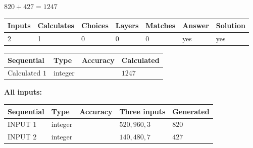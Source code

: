 \documentclass{ctexart}
\begin{document}
 

$ %
820 +  %
427=   %
1247$
 
 
\noindent{}
 
 

 
   
   
   
   
\noindent\begin{tabular}{|l|l|l|l|l|l|l|}
 \hline
Inputs & Calculates & Choices & Layers & Matches & Answer & Solution \\ \hline
 2  & 
 1  & 
 0
  & 
 0  & 
 0  & 
  yes & 
  yes 
  \\ \hline
 \end{tabular}
   
   
   
   
\noindent{}
   
   
  
  
\noindent\begin{tabular}{|l|l|l|l|}
\hline
 Sequential & Type & Accuracy & Calculated \\ 
\hline
 
 
  Calculated $  1 $ & integer &  & 
  $ 1247 $ 
 \\  \hline  
 \end{tabular}
   
   
   
   
\noindent\vspace{0.1in}\hspace{-0.08in} {\textbf{\Large{All inputs: }}}
   
   
  
  
\noindent\begin{tabular}{|l|l|l|l|l|}
\hline
 Sequential & Type & Accuracy & Three inputs & Generated \\ 
\hline
 
 
  INPUT $  1 $ & integer &  & $
 520
 , 
 960
 , 
 3
 $ & $ 820 $ 
 \\  \hline  
 
 
  INPUT $  2 $ & integer &  & $
 140
 , 
 480
 , 
 7
 $ & $ 427 $ 
 \\  \hline  
 \end{tabular}
   
   
   
   
   
   
 \vspace{0.2in}
 
\end{document}
